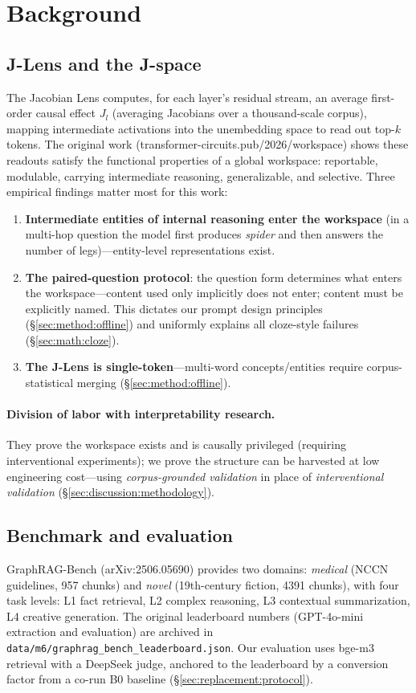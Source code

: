 \section{Background}
\label{sec:background}

\subsection{J-Lens and the J-space}

The Jacobian Lens computes, for each layer's residual stream, an average
first-order causal effect $J_l$ (averaging Jacobians over a thousand-scale
corpus), mapping intermediate activations into the unembedding space to read
out top-$k$ tokens. The original work
(transformer-circuits.pub/2026/workspace) shows these readouts satisfy the
functional properties of a global workspace: reportable, modulable, carrying
intermediate reasoning, generalizable, and selective. Three empirical findings
matter most for this work:

\begin{enumerate}
\item \textbf{Intermediate entities of internal reasoning enter the workspace}
(in a multi-hop question the model first produces \emph{spider} and then
answers the number of legs)---entity-level representations exist.
\item \textbf{The paired-question protocol}: the question form determines what
enters the workspace---content used only implicitly does not enter; content
must be explicitly named. This dictates our prompt design principles
(\S\ref{sec:method:offline}) and uniformly explains all cloze-style failures
(\S\ref{sec:math:cloze}).
\item \textbf{The J-Lens is single-token}---multi-word concepts/entities
require corpus-statistical merging (\S\ref{sec:method:offline}).
\end{enumerate}

\paragraph{Division of labor with interpretability research.}
They prove the workspace exists and is causally privileged (requiring
interventional experiments); we prove the structure can be harvested at low
engineering cost---using \emph{corpus-grounded validation} in place of
\emph{interventional validation} (\S\ref{sec:discussion:methodology}).

\subsection{Benchmark and evaluation}

GraphRAG-Bench (arXiv:2506.05690) provides two domains: \emph{medical} (NCCN
guidelines, 957 chunks) and \emph{novel} (19th-century fiction, 4391 chunks),
with four task levels: L1 fact retrieval, L2 complex reasoning, L3 contextual
summarization, L4 creative generation. The original leaderboard numbers
(GPT-4o-mini extraction and evaluation) are archived in
\texttt{data/m6/graphrag\_bench\_leaderboard.json}. Our evaluation uses bge-m3
retrieval with a DeepSeek judge, anchored to the leaderboard by a conversion
factor from a co-run B0 baseline (\S\ref{sec:replacement:protocol}).
